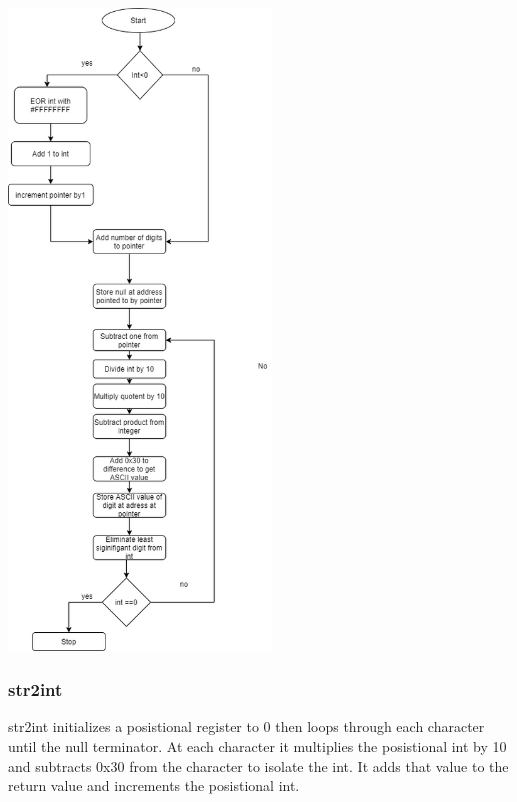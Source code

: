 \documentclass{article}
\begin{document}
        \begin{center}
            {\includegraphics[height=17cm]{int2str.png}\centering} 
        \end{center}
    \newpage

    \newpage
    \subsubsection{str2int}
        str2int initializes a posistional register to 0 then loops through each character 
        until the null terminator. At each character it multiplies the posistional int by
        10 and subtracts 0x30 from the character to isolate the int. It adds that value
        to the return value and increments the posistional int.
\end{document}
